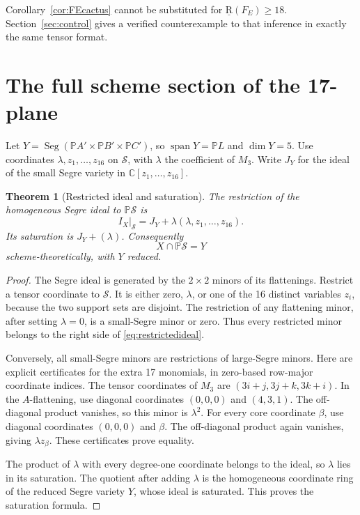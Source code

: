 \documentclass[11pt]{article}
\newtheorem{theorem}{Theorem}[section]
\theoremstyle{definition}\newtheorem{definition}[theorem]{Definition}
\theoremstyle{remark}\newtheorem{remark}[theorem]{Remark}
\newcommand{\C}{\mathbb C}
\newcommand{\PP}{\mathbb P}
\newcommand{\br}{\underline{\mathrm R}}
\newcommand{\Span}{\operatorname{span}}
\newcommand{\Seg}{\operatorname{Seg}}
\newcommand{\calS}{\mathcal S}
\begin{document}
Corollary~\ref{cor:FEcactus} cannot be substituted for $\br(F_E)\geq18$.
Section~\ref{sec:control} gives a verified counterexample to that inference in
exactly the same tensor format.

\section{The full scheme section of the 17-plane}

Let $Y=\Seg(\PP A'\times\PP B'\times\PP C')$, so $\Span Y=\PP L$ and
$\dim Y=5$. Use coordinates $\lambda,z_1,\ldots,z_{16}$ on $\calS$, with
$\lambda$ the coefficient of $M_3$. Write $J_Y$ for the ideal of the small
Segre variety in $\C[z_1,\ldots,z_{16}]$.

\begin{theorem}[Restricted ideal and saturation]\label{thm:section}
The restriction of the homogeneous Segre ideal to $\PP\calS$ is
\begin{equation}\label{eq:restrictedideal}
 I_X|_{\calS}=J_Y+\lambda(\lambda,z_1,\ldots,z_{16}).
\end{equation}
Its saturation is $J_Y+(\lambda)$. Consequently
\[
 X\cap\PP\calS=Y
\]
scheme-theoretically, with $Y$ reduced.
\end{theorem}
\begin{proof}
The Segre ideal is generated by the $2\times2$ minors of its flattenings.
Restrict a tensor coordinate to $\calS$. It is either zero, $\lambda$, or one
of the 16 distinct variables $z_i$, because the two support sets are disjoint.
The restriction of any flattening minor, after setting $\lambda=0$, is a
small-Segre minor or zero. Thus every restricted minor belongs to the right
side of \eqref{eq:restrictedideal}.

Conversely, all small-Segre minors are restrictions of large-Segre minors.
Here are explicit certificates for the extra 17 monomials, in zero-based
row-major coordinate indices. The tensor coordinates of $M_3$ are
$(3i+j,3j+k,3k+i)$. In the $A$-flattening, use diagonal coordinates
$(0,0,0)$ and $(4,3,1)$. The off-diagonal product vanishes, so this minor is
$\lambda^2$. For every core coordinate $\beta$, use diagonal coordinates
$(0,0,0)$ and $\beta$. The off-diagonal product again vanishes, giving
$\lambda z_\beta$. These certificates prove equality.

The product of $\lambda$ with every degree-one coordinate belongs to the
ideal, so $\lambda$ lies in its saturation. The quotient after adding
$\lambda$ is the homogeneous coordinate ring of the reduced Segre variety
$Y$, whose ideal is saturated. This proves the saturation formula.
\end{proof}
\end{document}
